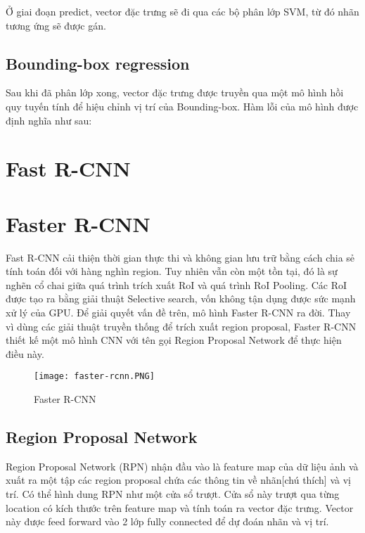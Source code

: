 \documentclass[../thesis.tex]{subfiles}
\begin{document}
Ở giai đoạn predict, vector đặc trưng sẽ đi qua các bộ phân lớp SVM, từ đó nhãn tương ứng sẽ được gán.

\subsection{Bounding-box regression}

Sau khi đã phân lớp xong, vector đặc trưng được truyền qua một mô hình hồi quy tuyến tính để hiệu chỉnh vị trí của Bounding-box. Hàm lỗi của mô hình được định nghĩa như sau:


\section{Fast R-CNN}


\section{Faster R-CNN}

Fast R-CNN cải thiện thời gian thực thi và không gian lưu trữ bằng cách chia sẻ tính toán đối với hàng nghìn region. Tuy nhiên vẫn còn một tồn tại, đó là sự nghẽn cổ chai giữa quá trình trích xuất RoI và quá trình RoI Pooling. Các RoI được tạo ra bằng giải thuật Selective search, vốn không tận dụng được sức mạnh xử lý của GPU. Để giải quyết vấn đề trên, mô hình Faster R-CNN ra đời. Thay vì dùng các giải thuật truyền thống để trích xuất region proposal, Faster R-CNN thiết kế một mô hình CNN với tên gọi Region Proposal Network để thực hiện điều này.

\begin{figure}[!htb]
	\centering
	\texttt{[image: faster-rcnn.PNG]}
	\caption{Faster R-CNN}\label{Fig:faster_rcnn}
\end{figure}

\subsection{Region Proposal Network}

Region Proposal Network (RPN) nhận đầu vào là feature map của dữ liệu ảnh và xuất ra một tập các region proposal chứa các thông tin về nhãn[chú thích] và vị trí. Có thể hình dung RPN như một cửa sổ trượt. Cửa sổ này trượt qua từng location có kích thước  trên feature map và tính toán ra vector đặc trưng. Vector này được feed forward vào 2 lớp fully connected để dự đoán nhãn và vị trí.
\end{document}
